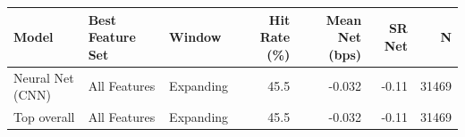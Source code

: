 \begin{tabular}{lllrrrr}
\toprule
Model & Best Feature Set & Window & Hit Rate (\%) & Mean Net (bps) & SR Net & N \\
\midrule
Neural Net (CNN) & All Features & Expanding & 45.5 & -0.032 & -0.11 & 31469 \\
\midrule
Top overall & All Features & Expanding & 45.5 & -0.032 & -0.11 & 31469 \\
\bottomrule
\end{tabular}
